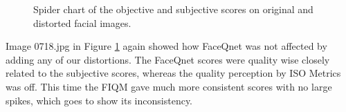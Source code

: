 \begin{figure}[h]
\centering
    \caption{Spider chart of the objective and subjective scores on original and distorted facial images.}
    \label{fig:SpiderDistortions}
\end{figure}
Image 0718.jpg in Figure \ref{fig:SpiderDistortions} again showed how FaceQnet was not affected by adding any of our distortions. The FaceQnet scores were quality wise closely related to the subjective scores, whereas the quality perception by ISO Metrics was off. This time the FIQM gave much more consistent scores with no large spikes, which goes to show its inconsistency. 

\newpage


